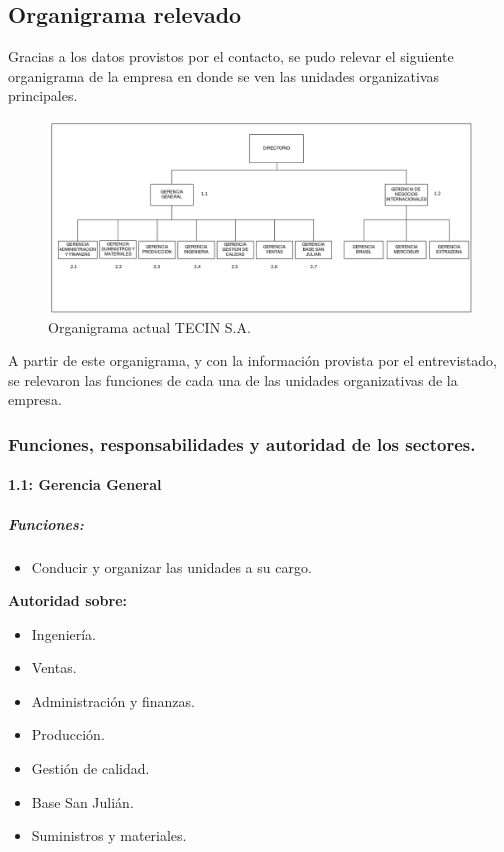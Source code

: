 \documentclass[a4paper,10pt]{article}
\begin{document}
	\subsection{Organigrama relevado}
	Gracias a los datos provistos por el contacto, se pudo relevar el siguiente organigrama de la empresa en donde se ven las unidades organizativas principales.
	\begin{figure}[H]
		\centering
		\includegraphics[width=15cm]{imagenes/actualOrganigrama.png}
		\caption{Organigrama actual TECIN S.A.}
	\end{figure}
	A partir de este organigrama, y con la información provista por el entrevistado, se relevaron las funciones de cada una de las unidades organizativas de la empresa.
	\subsubsection{Funciones, responsabilidades y autoridad de los sectores.}
		\paragraph{1.1: Gerencia General} 
		\subparagraph{Funciones:}

		\begin{itemize}
			\item Conducir y organizar las unidades a su cargo.
 		\end{itemize}
		
		\textbf{Autoridad sobre:}

		\begin{itemize}
			\item Ingeniería.
			\item Ventas.
			\item Administración y finanzas.
			\item Producción.
			\item Gestión de calidad.
			\item Base San Julián.
			\item Suministros y materiales.
		\end{itemize}
\end{document}

